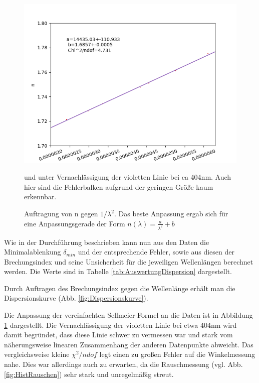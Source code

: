 \documentclass[12pt,a4paper]{article}
\begin{document}
\begin{figure}
\includegraphics[scale=1.0]{Bilder/Regression.png}
\caption{Auftragung von n gegen $1/\lambda^2$. Das beste Anpassung ergab sich für eine Anpassungsgerade der Form $n(\lambda) = \frac{a}{\lambda^2} + b $} und unter Vernachlässigung der violetten Linie bei ca 404nm. Auch hier sind die Fehlerbalken aufgrund der geringen Größe kaum erkennbar.
\label{fig:RegressionDispersion}
\end{figure}


Wie in der Durchführung beschrieben kann nun aus den Daten die Minimalablenkung $\delta_{min}$ und der entsprechende Fehler, sowie aus diesen der Brechungsindex und seine Unsicherheit für die jeweiligen Wellenlängen berechnet werden.
Die Werte sind in Tabelle \ref{tab:AuswertungDispersion} dargestellt.

Durch Auftragen des Brechungsindex gegen die Wellenlänge erhält man die Dispersionskurve (Abb. \ref{fig:Dispersionskurve}).

Die Anpassung der vereinfachten Sellmeier-Formel an die Daten ist in Abbildung \ref{fig:RegressionDispersion} dargestellt. Die Vernachlässigung der violetten Linie bei etwa 404nm wird damit begründet, dass diese Linie schwer zu vermessen war und stark vom näherungsweise linearen Zusammenhang der anderen Datenpunkte abweicht.
Das vergleichsweise kleine $\chi^2 / ndof$ legt einen zu großen Fehler auf die Winkelmessung nahe. Dies war allerdings auch zu erwarten, da die Rauschmessung (vgl. Abb. \ref{fig:HistRauschen}) sehr stark und unregelmäßig streut.
\newpage
\end{document}
